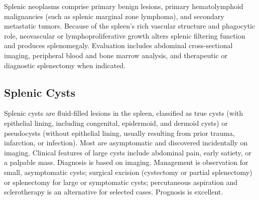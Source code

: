 


Splenic neoplasms comprise primary benign lesions, primary hematolymphoid malignancies (such as splenic marginal zone lymphoma), and secondary metastatic tumors. Because of the spleen's rich vascular structure and phagocytic role, neovascular or lymphoproliferative growth alters splenic filtering function and produces splenomegaly. Evaluation includes abdominal cross-sectional imaging, peripheral blood and bone marrow analysis, and therapeutic or diagnostic splenectomy when indicated.





\label{sec:Splenic Neoplasms}

\subsection{Splenic Cysts}
\label{sec:Splenic Cysts}
Splenic cysts are fluid-filled lesions in the spleen, classified as true cysts (with epithelial lining, including congenital, epidermoid, and dermoid cysts) or pseudocysts (without epithelial lining, usually resulting from prior trauma, infarction, or infection). Most are asymptomatic and discovered incidentally on imaging. Clinical features of large cysts include abdominal pain, early satiety, or a palpable mass. Diagnosis is based on imaging. Management is observation for small, asymptomatic cysts; surgical excision (cystectomy or partial splenectomy) or splenectomy for large or symptomatic cysts; percutaneous aspiration and sclerotherapy is an alternative for selected cases. Prognosis is excellent.

